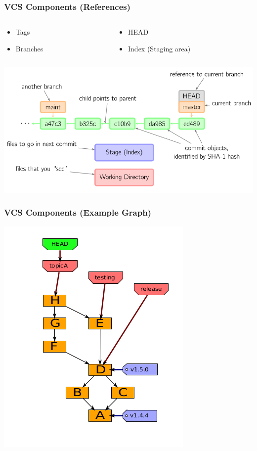 \documentclass[english,compress]{beamer}
\begin{document}
\frame
{
    \frametitle{VCS Components (References)}

    \begin{columns}
        \begin{column}{.5\textwidth}
    \begin{itemize}
        \item Tags
        \item Branches
    \end{itemize}
\end{column}
\begin{column}{.5\textwidth}
    \begin{itemize}
        \item HEAD
        \item Index (Staging area)
    \end{itemize}
\end{column}
\end{columns}
\begin{center}
    \includegraphics[width=\textwidth]{figs/visual-git.png}\cite{visual-git}
\end{center}
}

\frame
{
    \frametitle{VCS Components (Example Graph)}

	\begin{center}
		\includegraphics[height=.8\textheight]{figs/complicated-dag.png}
	\end{center}
}
\end{document}

